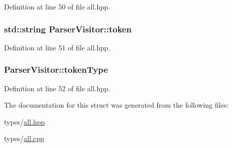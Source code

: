 Definition at line 50 of file all.\+hpp.

\hypertarget{struct_parser_visitor_a75c39e97645b48c171b9912440aa9ca2}{}
\subsubsection[{token}]{\setlength{\rightskip}{0pt plus 5cm}std\+::string Parser\+Visitor\+::token}\label{struct_parser_visitor_a75c39e97645b48c171b9912440aa9ca2}


Definition at line 51 of file all.\+hpp.

\hypertarget{struct_parser_visitor_acaa4d8ca1662ec314ae2a8f048f6aca3}{}
\subsubsection[{token\+Type}]{ Parser\+Visitor\+::token\+Type}\label{struct_parser_visitor_acaa4d8ca1662ec314ae2a8f048f6aca3}


Definition at line 52 of file all.\+hpp.



The documentation for this struct was generated from the following files\+:\begin{DoxyCompactItemize}
\item 
types/\hyperlink{types_2all_8hpp}{all.\+hpp}\item 
types/\hyperlink{types_2all_8cpp}{all.\+cpp}\end{DoxyCompactItemize}
